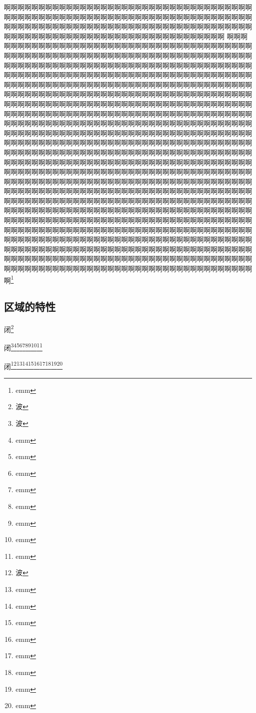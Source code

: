 \documentclass{ctexbook}
\begin{document}
啊啊啊啊啊啊啊啊啊啊啊啊啊啊啊啊啊啊啊啊啊啊啊啊啊啊啊啊啊啊啊啊啊啊啊啊啊啊啊啊啊啊啊啊啊啊啊啊啊啊啊啊啊啊啊啊啊啊啊啊啊啊啊啊啊啊啊啊啊啊啊啊啊啊啊啊啊啊啊啊啊啊啊啊啊啊啊啊啊啊啊啊啊啊啊啊啊啊啊啊啊啊啊啊啊啊啊啊啊啊啊啊啊啊啊啊啊啊啊啊啊啊啊啊啊啊啊啊啊啊啊啊啊啊啊啊啊啊啊啊
啊啊啊啊啊啊啊啊啊啊啊啊啊啊啊啊啊啊啊啊啊啊啊啊啊啊啊啊啊啊啊啊啊啊啊啊啊啊啊啊啊啊啊啊啊啊啊啊啊啊啊啊啊啊啊啊啊啊啊啊啊啊啊啊啊啊啊啊啊啊啊啊啊啊啊啊啊啊啊啊啊啊啊啊啊啊啊啊啊啊啊啊啊啊啊啊啊啊啊啊啊啊啊啊啊啊啊啊啊啊啊啊啊啊啊啊啊啊啊啊啊啊啊啊啊啊啊啊啊啊啊啊啊啊啊啊啊啊啊啊啊啊啊啊啊啊啊啊啊啊啊啊啊啊啊啊啊啊啊啊啊啊啊啊啊啊啊啊啊啊啊啊啊啊啊啊啊啊啊啊啊啊啊啊啊啊啊啊啊啊啊啊啊啊啊啊啊啊啊啊啊啊啊啊啊啊啊啊啊啊啊啊啊啊啊啊啊啊啊啊啊啊啊啊啊啊啊啊啊啊啊啊啊啊啊啊啊啊啊啊啊啊啊啊啊啊啊啊啊啊啊啊啊啊啊啊啊啊啊啊啊啊啊啊啊啊啊啊啊啊啊啊啊啊啊啊啊啊啊啊啊啊啊啊啊啊啊啊啊啊啊啊啊啊啊啊啊啊啊啊啊啊啊啊啊啊啊啊啊啊啊啊啊啊啊啊啊啊啊啊啊啊啊啊啊啊啊啊啊啊啊啊啊啊啊啊啊啊啊啊啊啊啊啊啊啊啊啊啊啊啊啊啊啊啊啊啊啊啊啊啊啊啊啊啊啊啊啊啊啊啊啊啊啊啊啊啊啊啊啊啊啊啊啊啊啊啊啊啊啊啊啊啊啊啊啊啊啊啊啊啊啊啊啊啊啊啊啊啊啊啊啊啊啊啊啊啊啊啊啊啊啊啊啊啊啊啊啊啊啊啊啊啊啊啊啊啊啊啊啊啊啊啊啊啊啊啊啊啊啊啊啊啊啊啊啊啊啊啊啊啊啊啊啊啊啊啊啊啊啊啊啊啊啊啊啊啊啊啊啊啊啊啊啊啊啊啊啊啊啊啊啊啊啊啊啊啊啊啊啊啊啊啊啊啊啊啊啊啊啊啊啊啊啊啊啊啊啊啊啊啊啊啊啊啊啊啊啊啊啊啊啊啊啊啊啊啊啊啊啊啊啊啊啊啊啊啊啊啊啊啊啊啊啊啊啊啊啊啊啊啊啊啊啊啊啊啊啊啊啊啊啊啊啊啊啊啊啊啊啊啊啊啊啊啊啊啊啊啊啊啊啊啊啊啊啊啊啊啊啊啊啊啊啊啊啊啊啊啊啊啊啊啊啊啊啊啊啊啊啊啊啊啊啊啊啊啊啊啊啊啊啊啊啊啊啊啊啊啊啊啊啊啊啊啊啊啊啊啊啊啊啊啊啊啊啊啊啊啊啊啊啊啊啊啊啊啊啊啊啊啊啊啊啊啊啊啊啊啊啊啊啊啊啊啊啊啊啊啊啊啊啊啊啊啊啊啊啊啊啊啊啊啊啊啊啊啊啊啊啊啊啊啊啊啊啊啊啊啊啊啊啊啊啊啊啊啊啊啊啊啊啊啊啊啊啊啊啊啊啊啊啊啊啊啊啊啊啊啊啊啊啊啊啊啊啊啊啊啊啊啊啊啊啊啊啊啊啊啊啊啊啊啊啊啊啊啊啊啊啊啊啊啊啊啊啊啊啊啊啊啊啊啊啊啊啊啊啊啊啊啊啊啊啊啊啊啊啊啊啊啊啊啊啊啊啊啊啊啊啊啊啊啊啊啊啊啊啊啊啊啊啊啊啊啊啊啊啊啊啊啊啊啊啊啊啊啊啊啊啊啊啊啊啊啊啊啊啊啊啊啊啊啊啊啊啊啊啊\footnote{emm}


\subsection{区域的特性}

闭\footnote{波}
\newpage

闭\footnote{波}\footnote{emm}\footnote{emm}\footnote{emm}\footnote{emm}\footnote{emm}\footnote{emm}\footnote{emm}\footnote{emm}
\newpage

闭\footnote{波}\footnote{emm}\footnote{emm}\footnote{emm}\footnote{emm}\footnote{emm}\footnote{emm}\footnote{emm}\footnote{emm}
\newpage
\end{document}
